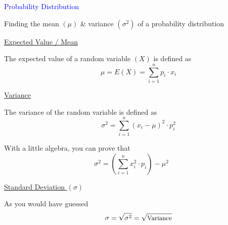 \documentclass[14pt,fleqn]{extarticle}
\begin{document}

\begin{skill}
\textcolor{blue}{Probability Distribution}

Finding the mean $(\mu)$ \& 
variance $(\sigma^2)$ of a probability distribution
\end{skill}

%

\newcard

\underline{Expected Value / Mean}\newline

The expected value of  a random 
variable $(X)$ is defined as 
\[ \qquad\mu = E(X) = \sum_{i=1}^n p_i\cdot x_i\]

\underline{Variance}\newline 

The variance of the random variable is
defined as 
\[ \qquad \sigma^2 = \sum_{i=1}^n (x_i - \mu)^2\cdot p_i^2\] 

With a little algebra, you can prove 
that \[ \sigma^2 = \left(\sum_{i=1}^n x_i^2\cdot p_i\right)- \mu^2 \] 

\underline{Standard Deviation $(\sigma)$}\newline

As you would have guessed 
\[\qquad \sigma = \sqrt{\sigma^2} = \sqrt{\text{\small{Variance}}}\]
%
\end{document}
